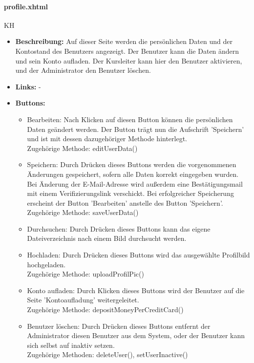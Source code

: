				\paragraph{profile.xhtml}
					KH\\
					\begin{itemize}
						\item \textbf{Beschreibung:} Auf dieser Seite werden die persönlichen Daten und der Kontostand des Benutzers angezeigt. Der Benutzer kann die Daten ändern und sein Konto aufladen. Der Kursleiter kann hier den Benutzer aktivieren, und der Administrator den Benutzer löschen.
						\item \textbf{Links:} -
						\item \textbf{Buttons:}
							\begin{itemize}
								\item Bearbeiten: Nach Klicken auf diesen Button können die persönlichen Daten geändert werden. Der Button trägt nun die Aufschrift 'Speichern' und ist mit dessen dazugehöriger Methode hinterlegt. \\ Zugehörige Methode: editUserData()
								\item Speichern: Durch Drücken dieses Buttons werden die vorgenommenen Änderungen gespeichert, sofern alle Daten korrekt eingegeben wurden. Bei Änderung der E-Mail-Adresse wird außerdem eine Bestätigungsmail mit einem Verifizierungslink verschickt. Bei erfolgreicher Speicherung erscheint der Button 'Bearbeiten' anstelle des Button 'Speichern'. \\ Zugehörige Methode: saveUserData()
								\item Durchsuchen: Durch Drücken dieses Buttons kann das eigene Dateiverzeichnis nach einem Bild durchsucht werden.
								\item Hochladen: Durch Drücken dieses Buttons wird das ausgewählte Profilbild hochgeladen. \\ Zugehörige Methode: uploadProfilPic()
								\item Konto aufladen: Durch Klicken dieses Buttons wird der Benutzer auf die Seite 'Kontoaufladung' weitergeleitet. \\ Zugehörige Methode: depositMoneyPerCreditCard()
								\item Benutzer löschen: Durch Drücken dieses Buttons entfernt der Administrator diesen Benutzer aus dem System, oder der Benutzer kann sich selbst auf inaktiv setzen. \\ Zugehörige Methoden: deleteUser(), setUserInactive() 
							\end{itemize}

\end{itemize}
